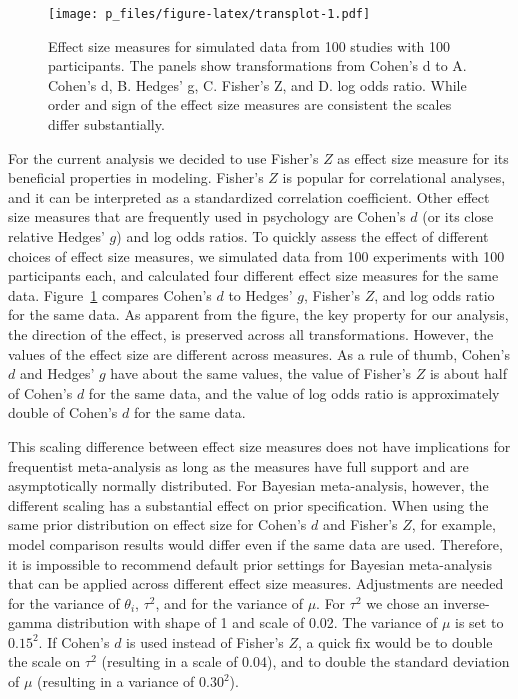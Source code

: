 \documentclass[english,,man]{apa6}
\begin{document}
\begin{figure}
\centering
\texttt{[image: p\_files/figure-latex/transplot-1.pdf]}
\caption{\label{fig:transplot}Effect size measures for simulated data from 100 studies with 100 participants. The panels show transformations from Cohen's d to A. Cohen's d, B. Hedges' g, C. Fisher's Z, and D. log odds ratio. While order and sign of the effect size measures are consistent the scales differ substantially.}
\end{figure}

For the current analysis we decided to use Fisher's \(Z\) as effect size measure for its beneficial properties in modeling. Fisher's \(Z\) is popular for correlational analyses, and it can be interpreted as a standardized correlation coefficient. Other effect size measures that are frequently used in psychology are Cohen's \(d\) (or its close relative Hedges' \(g\)) and log odds ratios. To quickly assess the effect of different choices of effect size measures, we simulated data from 100 experiments with 100 participants each, and calculated four different effect size measures for the same data. Figure~\ref{fig:transplot} compares Cohen's \(d\) to Hedges' \(g\), Fisher's \(Z\), and log odds ratio for the same data. As apparent from the figure, the key property for our analysis, the direction of the effect, is preserved across all transformations. However, the values of the effect size are different across measures. As a rule of thumb, Cohen's \(d\) and Hedges' \(g\) have about the same values, the value of Fisher's \(Z\) is about half of Cohen's \(d\) for the same data, and the value of log odds ratio is approximately double of Cohen's \(d\) for the same data.

This scaling difference between effect size measures does not have implications for frequentist meta-analysis as long as the measures have full support and are asymptotically normally distributed. For Bayesian meta-analysis, however, the different scaling has a substantial effect on prior specification. When using the same prior distribution on effect size for Cohen's \(d\) and Fisher's \(Z\), for example, model comparison results would differ even if the same data are used. Therefore, it is impossible to recommend default prior settings for Bayesian meta-analysis that can be applied across different effect size measures. Adjustments are needed for the variance of \(\theta_i\), \(\tau^2\), and for the variance of \(\mu\). For \(\tau^2\) we chose an inverse-gamma distribution with shape of 1 and scale of 0.02. The variance of \(\mu\) is set to \(0.15^2\). If Cohen's \(d\) is used instead of Fisher's \(Z\), a quick fix would be to double the scale on \(\tau^2\) (resulting in a scale of 0.04), and to double the standard deviation of \(\mu\) (resulting in a variance of \(0.30^2\)).
\end{document}
